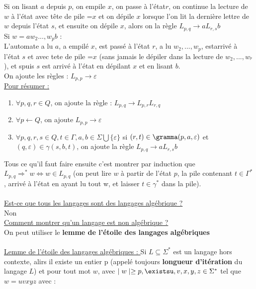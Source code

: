 \documentclass{article}
\begin{document}
\begin{enumerate}
        Si on lisant $a$ depuis $p$, on empile $x$, on passe à l'état$r$, on continue la lecture de $w$ à l'état avec tête de pile =$x$ et on dépile $x$ lorsque l'on lit la dernière lettre de $w$ depuis l'état $s$, et ensuite on dépile $x$, alors on la règle $L_{p,q} \rightarrow aL_{r,s}b$ \\
        Si $w=aw_2 ... ,w_p b$ : \\
        L'automate a lu $a$, a empilé $x$, est passé à l'état $r$, a lu $w_2,...,w_p$, estarrivé à l'état $s$ et avec tete de pile =$x$ (sans jamais le dépiler dans la lecture de $w_2,...,w_^p$), et spuis $s$ est arrivé à l'état en dépilant $x$ et en lisant $b$. \\
        On ajoute les règles : $L_{p,p} \rightarrow \varepsilon$ \\
        \underline{Pour résumer : } \\
        \begin{enumerate}
            \item $\forall p,q,r \in Q$, on ajoute la règle : $L_{p,q} \rightarrow L_{p,r}L_{r,q}$ \\
            \item $\forall p \leftarrow Q$, on ajoute $L_{p,p} \rightarrow \varepsilon$
            \item $\forall p,q,r,s \in Q, t \in \Gamma, a,b \in \Sigma \bigcup \{\varepsilon\}$ si $(r,t) \in \gramma(p,a,\varepsilon)$ et $(q, \varepsilon) \in \gamma(s,b,t)$, on ajoute la règle $L_{p,q} \rightarrow aL_{r,s}b$
        \end{enumerate}
        Tous ce qu'il faut faire ensuite c'est montrer par induction que $L_{p,q} \Rightarrow^* w \Leftrightarrow w \in L_{p,q}$ (on peut lire $w$ à partir de l'état $p$, la pile contenant $t \in \Gamma^*$, arrivé à l'état en ayant lu tout w, et laisser $t \in \gamma^*$ dans la pile). \\
        \\ 
        \underline{Est-ce que tous les langages sont des langages algébrique ?} \\
        Non \\
        \underline{Comment montrer qu'un langage est non algébrique ?} \\ 
        On peut utiliser le \textbf{lemme de l'étoile des langages algébriques} \\
        \\
        \underline{Lemme de l'étoile des langages algébriques : }
        Si $L \subseteq \Sigma^*$ est un langage hors contexte, alirs il existe un entier p (appelé toujours \textbf{longueur d'itération} du langage $L$) et pour tout mot $w$, avec $\mid w \mid \ge p, \existsu,v,x,y,z \in \Sigma^*$ tel que $w=uvxyz$ avec : \\ 

\end{enumerate}
\end{document}
